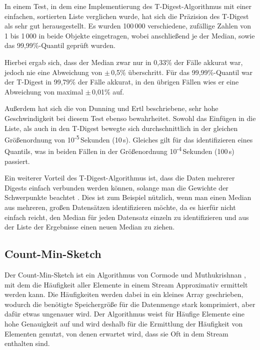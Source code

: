 In einem Test, in dem eine Implementierung des T-Digest-Algorithmus mit einer einfachen, sortierten Liste verglichen wurde, hat sich die Präzision des T-Digest als sehr gut herausgestellt.
Es wurden 100\,000 verschiedene, zufällige Zahlen von 1 bis 1\,000 in beide Objekte eingetragen, wobei anschließend je der Median, sowie das 99,99\%-Quantil geprüft wurden.

Hierbei ergab sich, dass der Median zwar nur in 0,33\% der Fälle akkurat war, jedoch nie eine Abweichung von $\pm$\,0,5\% überschritt.
Für das 99,99\%-Quantil war der T-Digest in 99,79\% der Fälle akkurat, in den übrigen Fällen wies er eine Abweichung von maximal $\pm$\,0,01\% auf.

Außerdem hat sich die von Dunning und Ertl \cite{dunning2019} beschriebene, sehr hohe Geschwindigkeit bei diesem Test ebenso bewahrheitet.
Sowohl das Einfügen in die Liste, als auch in den T-Digest bewegte sich durchschnittlich in der gleichen Größenordnung von 10\textsuperscript{-5}\,Sekunden (10\,\textmu{}s).
Gleiches gilt für das identifizieren eines Quantils, was in beiden Fällen in der Größenordnung 10\textsuperscript{-4}\,Sekunden (100\,\textmu{}s) passiert.

Ein weiterer Vorteil des T-Digest-Algorithmus ist, dass die Daten mehrerer Digests einfach verbunden werden können, solange man die Gewichte der Schwerpunkte beachtet \cite{dunning2019}.
Dies ist zum Beispiel nützlich, wenn man einen Median aus mehreren, großen Datensätzen identifizieren möchte, da es hierfür nicht einfach reicht, den Median für jeden Datensatz einzeln zu identifizieren und aus der Liste der Ergebnisse einen neuen Median zu ziehen.


\subsection{Count-Min-Sketch}

Der Count-Min-Sketch ist ein Algorithmus von Cormode und Muthukrishnan \cite{cormode2005}, 
mit dem die Häufigkeit aller Elemente in einem Stream Approximativ ermittelt werden kann. 
Die Häufigkeiten werden dabei in ein kleines Array geschrieben, 
wodurch die benötigte Speichergröße für die Datenmenge stark komprimiert, 
aber dafür etwas ungenauer wird. 
Der Algorithmus weist für Häufige Elemente eine hohe Genauigkeit auf 
und wird deshalb für die Ermittlung der Häufigkeit von Elementen genutzt, 
von denen erwartet wird, dass sie Oft in dem Stream enthalten sind.


